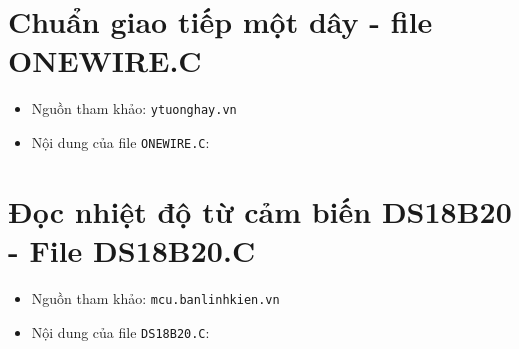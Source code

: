\section{Chuẩn giao tiếp một dây - file ONEWIRE.C} \label{ONEWIRE}
\begin{itemize}
\item Nguồn tham khảo: \verb|ytuonghay.vn|
\item Nội dung của file \verb|ONEWIRE.C|:

\end{itemize}
\newpage
\section{Đọc nhiệt độ từ cảm biến DS18B20 - File DS18B20.C} \label{codeDS}
\begin{itemize}
\item Nguồn tham khảo: \verb|mcu.banlinhkien.vn|
\item Nội dung của file \verb|DS18B20.C|:

\end{itemize}